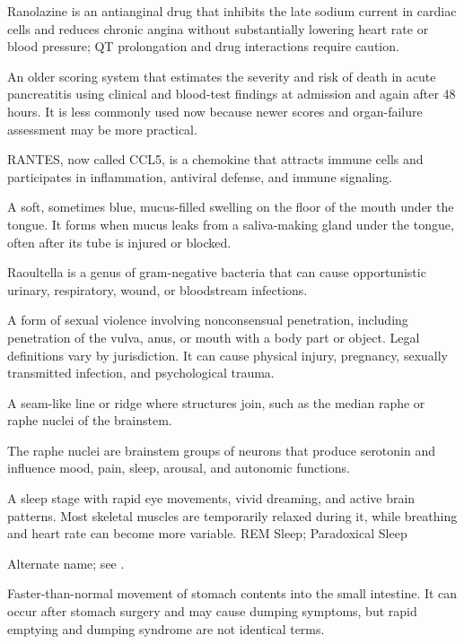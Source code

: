  Ranolazine is an antianginal drug that inhibits the late sodium current in cardiac cells and reduces chronic angina without substantially lowering heart rate or blood pressure; QT prolongation and drug interactions require caution.

 An older scoring system that estimates the severity and risk of death in acute pancreatitis using clinical and blood-test findings at admission and again after 48 hours. It is less commonly used now because newer scores and organ-failure assessment may be more practical.

 RANTES, now called CCL5, is a chemokine that attracts immune cells and participates in inflammation, antiviral defense, and immune signaling.

 A soft, sometimes blue, mucus-filled swelling on the floor of the mouth under the tongue. It forms when mucus leaks from a saliva-making gland under the tongue, often after its tube is injured or blocked.

 Raoultella is a genus of gram-negative bacteria that can cause opportunistic urinary, respiratory, wound, or bloodstream infections.

 A form of sexual violence involving nonconsensual penetration, including penetration of the vulva, anus, or mouth with a body part or object. Legal definitions vary by jurisdiction. It can cause physical injury, pregnancy, sexually transmitted infection, and psychological trauma.

 A seam-like line or ridge where structures join, such as the median raphe or raphe nuclei of the brainstem.

 The raphe nuclei are brainstem groups of neurons that produce serotonin and influence mood, pain, sleep, arousal, and autonomic functions.

 A sleep stage with rapid eye movements, vivid dreaming, and active brain patterns. Most skeletal muscles are temporarily relaxed during it, while breathing and heart rate can become more variable.
\synonyms
REM Sleep; Paradoxical Sleep

 Alternate name; see .

 Faster-than-normal movement of stomach contents into the small intestine. It can occur after stomach surgery and may cause dumping symptoms, but rapid emptying and dumping syndrome are not identical terms.

